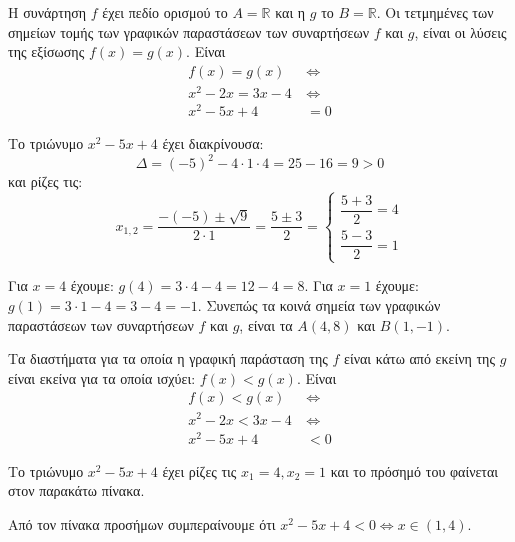 
\begin{alist}
\item Η συνάρτηση $f$ έχει πεδίο ορισμού το $A = \mathbb{R}$ και η $g$ το $B = \mathbb{R}$.
Οι τετμημένες των σημείων τομής των γραφικών παραστάσεων των συναρτήσεων $f$ και $g$, είναι οι λύσεις της εξίσωσης $f(x) = g(x)$. Είναι
\begin{align*}
f(x) = g(x) \ &\Leftrightarrow \\
x^2 - 2x = 3x - 4 \ &\Leftrightarrow \\
x^2 - 5x + 4 &= 0
\end{align*}

Το τριώνυμο $x^2 - 5x + 4$ έχει διακρίνουσα:
\[\Delta = (-5)^2 - 4 \cdot 1 \cdot 4 = 25 - 16 = 9 > 0\]
και ρίζες τις:
\[x_{1,2} = \dfrac{-(-5) \pm \sqrt{9}}{2 \cdot 1} = \dfrac{5 \pm 3}{2} = \begin{cases} \dfrac{5 + 3}{2} = 4 \\ \dfrac{5 - 3}{2} = 1 \end{cases}\]

Για $x = 4$ έχουμε: $g(4) = 3 \cdot 4 - 4 = 12 - 4 = 8$.
Για $x = 1$ έχουμε: $g(1) = 3 \cdot 1 - 4 = 3 - 4 = -1$.
Συνεπώς τα κοινά σημεία των γραφικών παραστάσεων των συναρτήσεων $f$ και $g$, είναι τα $A(4, 8)$ και $B(1, -1)$.

\item Τα διαστήματα για τα οποία η γραφική παράσταση της $f$ είναι κάτω από εκείνη της $g$ είναι εκείνα για τα οποία ισχύει: $f(x) < g(x)$. Είναι
\begin{align*}
f(x) < g(x) \ &\Leftrightarrow \\
x^2 - 2x < 3x - 4 \ &\Leftrightarrow \\
x^2 - 5x + 4 &< 0
\end{align*}

Το τριώνυμο $x^2 - 5x + 4$ έχει ρίζες τις $x_1 = 4, x_2 = 1$ και το πρόσημό του φαίνεται στον παρακάτω πίνακα.

\begin{center}
\end{center}

Από τον πίνακα προσήμων συμπεραίνουμε ότι $x^2 - 5x + 4 < 0 \Leftrightarrow x \in (1, 4)$.


\end{alist}
